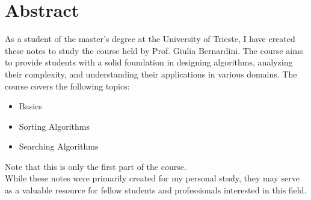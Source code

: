 
\chapter*{Abstract}

As a student of the  master's degree at the University of Trieste, I have created these notes to study the course  held by Prof. Giulia Bernardini. The course aims to provide students with a solid foundation in designing algorithms, analyzing their complexity, and understanding their applications in various domains.
The course covers the following topics:
\begin{itemize}
    \item Basics
    \item Sorting Algorithms
    \item Searching Algorithms
\end{itemize}
Note that this is only the first part of the course. \\
While these notes were primarily created for my personal study, they may serve as a valuable resource for fellow students and professionals interested in this field.
